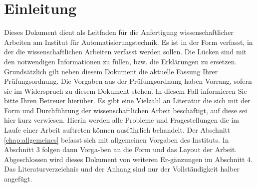 \chapter{Einleitung}
\label{chap:einleitung}

Dieses Dokument dient als Leitfaden für die Anfertigung wissenschaftlicher Arbeiten am Institut für Automatisierungstechnik. Es ist in der Form verfasst, in der die wissenschaftlichen Arbeiten verfasst werden sollen. Die Lücken sind mit den notwendigen Informationen zu füllen, bzw. die Erklärungen zu ersetzen.
Grundsätzlich gilt neben diesem Dokument die aktuelle Fassung Ihrer Prüfungsordnung. Die Vorgaben aus der Prüfungsordnung haben Vorrang, sofern sie im Widerspruch zu diesem Dokument stehen. In diesem Fall informieren Sie bitte Ihren Betreuer hierüber.
Es gibt eine Vielzahl an Literatur die sich mit der Form und Durchführung der wissenschaftlichen Arbeit beschäftigt, auf diese sei hier kurz verwiesen. Hierin werden alle Probleme und Fragestellungen die im Laufe einer Arbeit auftreten können ausführlich behandelt.
Der Abschnitt \ref{chap:allgemeines} befasst sich mit allgemeinen Vorgaben des Instituts. In Abschnitt 3 folgen dann Vorga-ben an die Form und das Layout der Arbeit. Abgeschlossen wird dieses Dokument von weiteren Er-gänzungen im Abschnitt 4. Das Literaturverzeichnis und der Anhang sind nur der Vollständigkeit halber angefügt. 